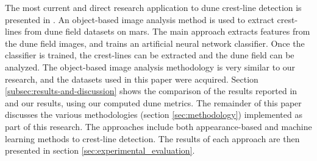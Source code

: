 The most current and direct research application to dune crest-line detection is presented in \cite{vaz_object_based_dune_analysis}. An object-based image analysis method is used to extract crest-lines from dune field datasets on mars. The main approach extracts features from the dune field images, and trains an artificial neural network classifier. Once the classifier is trained, the crest-lines can be extracted and the dune field can be analyzed. The object-based image analysis methodology is very similar to our research, and the datasets used in this paper were acquired. Section \ref{subsec:results-and-discussion} shows the comparison of the results reported in \cite{vaz_object_based_dune_analysis} and our results, using our computed dune metrics. The remainder of this paper discusses the various methodologies (section \ref{sec:methodology}) implemented as part of this research. The approaches include both appearance-based and machine learning methods to crest-line detection. The results of each approach are then presented in section \ref{sec:experimental_evaluation}.